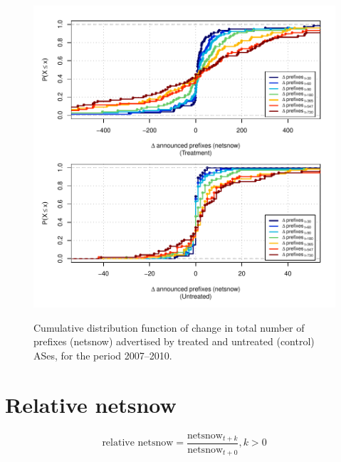 \begin{figure}[H]
\begin{centering}
\begin{singlespace}
    \includegraphics[width=6in]{figures/behavior-netsnow-2007_2010-corr.pdf}
    \vspace{-2em}\\
    \caption{Cumulative distribution function of change in total number of prefixes (netsnow) advertised by treated and untreated (control) ASes, for the period 2007--2010.}
\end{singlespace}
\end{centering}
\end{figure}

\section{Relative netsnow}

\[
\textrm{relative netsnow} = \frac{\textrm{netsnow}_{t+k}}
                                 {\textrm{netsnow}_{t+0}}, k > 0
\]

